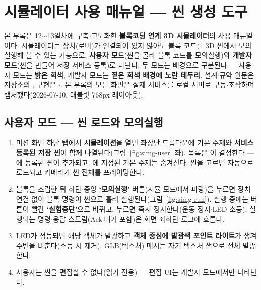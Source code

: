 \chapter{시뮬레이터 사용 매뉴얼 --- 씬 생성 도구}
\label{app:simguide}

본 부록은 12$\sim$13일차에 구축$\cdot$고도화한 \textbf{블록코딩 연계 3D 시뮬레이터}의
사용 매뉴얼이다. 시뮬레이터는 장치(로버)가 연결되어 있지 않아도 블록 코드를 3D 씬에서
모의실행해 볼 수 있는 기능으로, \textbf{사용자 모드}(씬을 골라 블록 코드를 모의실행)와
\textbf{개발자 모드}(씬을 만들어 저장$\cdot$서비스 등록)로 나뉜다. 두 모드는 배경으로
구분된다 --- 사용자 모드는 \textbf{밝은 회색}, 개발자 모드는 \textbf{짙은 회색 배경에
노란 테두리}. 설계$\cdot$규약 원문은 저장소의 , 구현은
$\cdot$. 본 부록의 모든 화면은 실제
서비스를 로컬 서버로 구동$\cdot$조작하며 캡처했다(2026-07-10, 태블릿 768px 레이아웃).

\section{사용자 모드 --- 씬 로드와 모의실행}
\begin{enumerate}
  \item 미션 화면 하단 탭에서 \textbf{시뮬레이션}을 열면 좌상단 드롭다운에 기본 주제와
  \textbf{서비스 등록된 저장 씬}이 함께 나열된다(그림~\ref{fig:simg-user} 좌).
  목록은 이 결정한다 --- 에 등록된 씬이
  추가되고, 에 지정된 기본 주제는 숨겨진다. 씬을 고르면 자동으로
  로드되고 카메라가 씬 전체를 프레이밍한다.
  \item 블록을 조립한 뒤 하단 중앙 \textbf{`모의실행'} 버튼(시뮬 모드에서 파랑)을 누르면
  장치 연결 없이 블록 명령이 씬으로 흘러 실행된다(그림~\ref{fig:simg-run}). 실행 중에는
  버튼이 빨간 \textbf{`실험중단'}으로 바뀌고, 누르면 즉시 정지한다(운동 정지$\cdot$LED 소등).
  실행되는 명령$\cdot$응답 스트림(Ack$\cdot$대기 포함)은 화면 좌하단 로그에 흐른다.
  \item LED가 점등되면 해당 객체가 발광하고 \textbf{객체 중심에 발광색 포인트 라이트}가
  생겨 주변을 비춘다(소등 시 제거). GLB(텍스처) 메시는 자기 텍스처 색으로 전체 발광한다.
  \item 사용자는 씬을 편집할 수 없다(읽기 전용) --- 편집 UI는 개발자 모드에서만 나타난다.
\end{enumerate}

